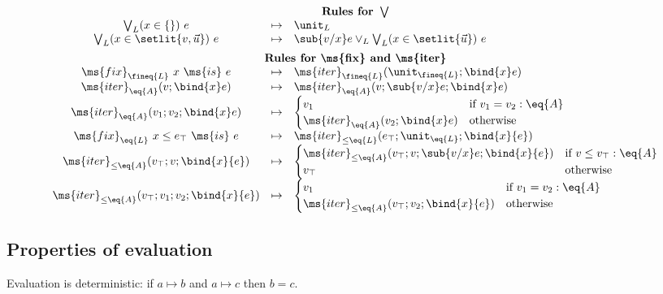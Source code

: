 \documentclass{article}
\newcommand{\tforin}[2]{\bigvee_{#1}(#2)\ }
\newcommand{\tfix}[2]{\ms{fix}_{#1}~{#2}~\ms{is}~}
\newcommand{\tfixle}[3]{\tfix{#1}{#2 \le #3}}
\newcommand{\iter}[4]{\ms{iter}_{#1}({#2}; \bind{#3}#4)}
\newcommand{\iterstep}[5]{\ms{iter}_{#1}({#2}; {#3}; {\bind{#4}#5})}
\newcommand{\iterle}[5]{\ms{iter}_{{\le}#1}({#2}; {#3}; \bind{#4}{#5})}
\newcommand{\iterlestep}[6]{\ms{iter}_{{\le}#1}({#2}; {#3}; {#4}; \bind{#5}{#6})}
\newcommand{\step}{\mapsto}
\begin{document}
\[\begin{array}{ccl}
  \vspace{0.5em}\\
  \multicolumn{3}{c}{\textbf{Rules for }\bigvee}\\
  \tforin{L}{x \in \{\}} e &\step& \unit_L\\
  \tforin{L}{x \in \setlit{v, \vec{u}}} e
  &\step& \sub{v/x} e \vee_L \tforin{L}{x \in \setlit{\vec{u}}} e

  \vspace{0.5em}\\
  \multicolumn{3}{c}{\textbf{Rules for \ms{fix} and \ms{iter}}}\\
  \tfix{\fineq{L}}{x}{e} &\step& \iter{\fineq{L}}{\unit_{\fineq{L}}}{x}{e}\\
  \iter{\eq{A}}{v}{x}{e} &\step& \iterstep{\eq{A}}{v}{\sub{v/x} e}{x}{e}\\
  \iterstep{\eq{A}}{v_1}{v_2}{x}{e}
  &\step& \begin{cases}
    v_1 & \text{if}~{v_1 = v_2 : \eq{A}}\\
    \iter{\eq{A}}{v_2}{x}{e} & \text{otherwise}
  \end{cases}\\
  \tfixle{\eq{L}}{x}{e_\top}{e} &\step& \iterle{\eq{L}}{e_\top}{\unit_{\eq{L}}}{x}{e}\\
  \iterle{\eq{A}}{v_\top}{v}{x}{e}
  &\step& \begin{cases}
    \iterlestep{\eq{A}}{v_\top}{v}{\sub{v/x} e}{x}{e} & \text{if}~{v \le v_\top : \eq{A}}\\
    v_\top & \text{otherwise}
  \end{cases}\\
  \iterlestep{\eq{A}}{v_\top}{v_1}{v_2}{x}{e}
  &\step& \begin{cases}
    v_1 &\text{if}~{v_1 = v_2 : \eq{A}}\\
    \iterle{\eq{A}}{v_\top}{v_2}{x}{e} & \text{otherwise}
  \end{cases}
\end{array}
\]

\subsection{Properties of evaluation}

\begin{theorem}
  Evaluation is deterministic: if $a \step b$ and $a \step c$ then $b = c$.
\end{theorem}
\end{document}
